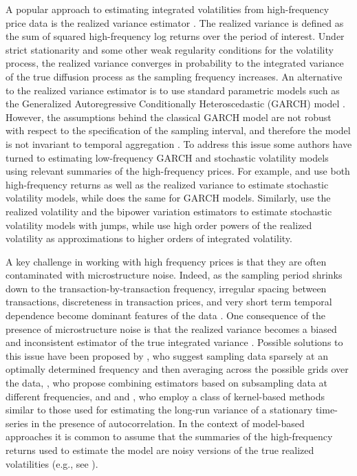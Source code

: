 \documentclass[10pt]{article}
\begin{document}
A popular approach to estimating integrated volatilities from high-frequency price data is the realized variance estimator \citep{comte1998long,andersen2001distribution,barndorff2002estimating}.  The realized variance is defined as the sum of squared high-frequency log returns over the period of interest.  Under strict stationarity and some other weak regularity conditions for the volatility process, the realized variance converges in probability to the integrated variance of the true diffusion process as the sampling frequency increases.  An alternative to the realized variance estimator is to use standard parametric models such as the Generalized Autoregressive Conditionally Heteroscedastic (GARCH) model \citep{bollerslev1986,andersen1997intraday}.  However, the assumptions behind the classical GARCH model are not robust with respect to the specification of the sampling interval, and therefore the model is not invariant to temporal aggregation \citep{drost1993aggregation,andersen1997intraday,zumbach2000pitfalls}.  To address this issue some authors have turned to estimating low-frequency GARCH and stochastic volatility models using relevant summaries of the high-frequency prices.  For example, \cite{takahashi2009estimating} and \cite{shirota2014realized} use both high-frequency returns as well as the realized variance to estimate stochastic volatility models, while \cite{hansen2012realized} does the same for GARCH models.  Similarly, \cite{maneesoonthorn2014inference} use the realized volatility and the bipower variation estimators to estimate stochastic volatility models with jumps, while \cite{bollerslev2002estimating} use high order powers of the realized volatility as approximations to higher orders of integrated volatility.

A key challenge in working with high frequency prices is that they are often contaminated with microstructure noise. Indeed, as the sampling period shrinks down to the transaction-by-transaction frequency, irregular spacing between transactions, discreteness in transaction prices, and very short term temporal dependence become dominant features of the data \citep{stoll2000presidential}.  One consequence of the presence of microstructure noise is that the realized variance becomes a biased and inconsistent estimator of the true integrated variance \citep{zhou1996high}.  Possible solutions to this issue have been proposed by \cite{zhang2005tale}, who suggest sampling data sparsely at an optimally determined frequency and then averaging across the possible grids over the data, \cite{ait2011ultra}, who propose combining estimators based on subsampling data at different frequencies, and \cite{hansen2006realized} and \cite{barndorff2008designing}, who employ a class of kernel-based methods similar to those used for estimating the long-run variance of a stationary time-series in the presence of autocorrelation. In the context of model-based approaches it is common to assume that the summaries of the high-frequency returns used to estimate the model are noisy versions of the true realized volatilities (e.g., see \citealp{venter2012extended, shirota2014realized}).
\end{document}
